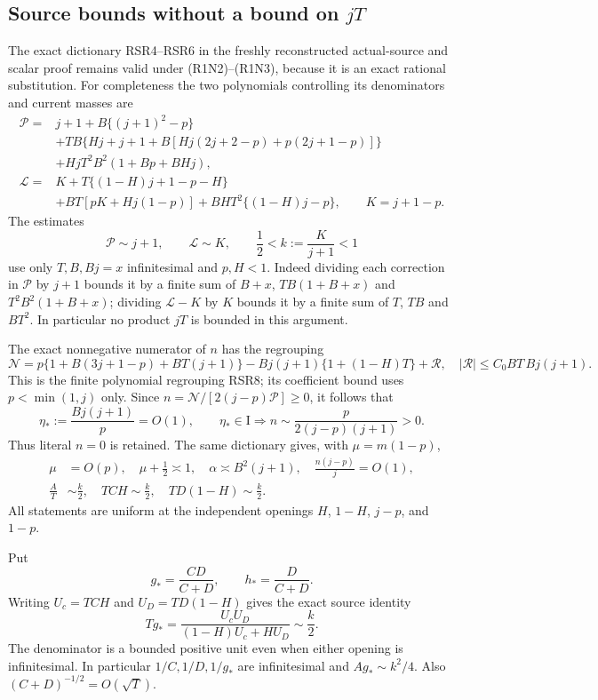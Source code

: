 \subsection{Source bounds without a bound on \(jT\)}

The exact dictionary RSR4--RSR6 in the freshly reconstructed
actual-source and scalar proof remains valid under
(R1N2)--(R1N3), because it is an exact rational substitution.
For completeness the two polynomials controlling its denominators
and current masses are
\begin{align*}
 \mathcal P={}&j+1+B\{(j+1)^2-p\}\\
 &+TB\{Hj+j+1+B[Hj(2j+2-p)+p(2j+1-p)]\}\\
 &+HjT^2B^2(1+Bp+BHj),\\
 \mathcal L={}&K+T\{(1-H)j+1-p-H\}\\
 &+BT[pK+Hj(1-p)]+BHT^2\{(1-H)j-p\},
 \qquad K=j+1-p .
\end{align*}
The estimates
\[
 \mathcal P\sim j+1,\qquad \mathcal L\sim K,\qquad
 \frac12<k:=\frac K{j+1}<1                               \tag{R1N4}
\]
use only $T,B,Bj=x$ infinitesimal and $p,H<1$.
Indeed dividing each correction in $\mathcal P$ by $j+1$ bounds it
by a finite sum of $B+x$, $TB(1+B+x)$ and
$T^2B^2(1+B+x)$; dividing $\mathcal L-K$ by $K$ bounds it
by a finite sum of $T$, $TB$ and $BT^2$.
In particular no product $jT$ is bounded in this argument.

The exact nonnegative numerator of $n$ has the regrouping
\[
 \mathcal N=p\{1+B(3j+1-p)+BT(j+1)\}
       -Bj(j+1)\{1+(1-H)T\}+\mathcal R ,
 \quad |\mathcal R|\le C_0BT\,Bj(j+1).                   \tag{R1N5}
\]
This is the finite polynomial regrouping RSR8; its coefficient bound
uses $p<\min(1,j)$ only.  Since
$n=\mathcal N/[2(j-p)\mathcal P]\ge0$, it follows that
\[
 \eta_*:=\frac{Bj(j+1)}p=O(1),\qquad
 \eta_*\in\mathrm I
 \Longrightarrow n\sim\frac{p}{2(j-p)(j+1)}>0.           \tag{R1N6}
\]
Thus literal $n=0$ is retained.  The same dictionary gives, with
$\mu=m(1-p)$,
\[
\begin{aligned}
 \mu&=O(p),\quad \mu+\tfrac12\asymp1,\quad
 \alpha\asymp B^2(j+1),\quad \frac{n(j-p)}j=O(1),\\
 \frac AT&\sim\frac k2,\quad
 TCH\sim\frac k2,\quad TD(1-H)\sim\frac k2.
\end{aligned}                                          \tag{R1N7}
\]
All statements are uniform at the independent openings $H$, $1-H$,
$j-p$, and $1-p$.

Put
\[
 g_*=\frac{CD}{C+D},\qquad h_*=\frac D{C+D}.
\]
Writing $U_c=TCH$ and $U_D=TD(1-H)$ gives the exact source identity
\[
 Tg_*=\frac{U_cU_D}{(1-H)U_c+HU_D}\sim\frac k2.          \tag{R1N8}
\]
The denominator is a bounded positive unit even when either opening
is infinitesimal.  In particular
$1/C,1/D,1/g_*$ are infinitesimal and
$Ag_*\sim k^2/4$.  Also $(C+D)^{-1/2}=O(\sqrt T)$.

